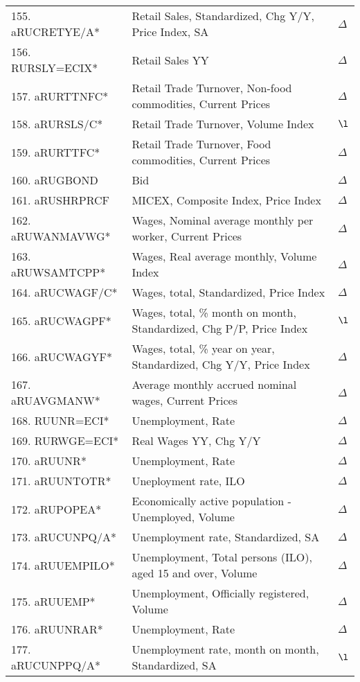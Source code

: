 \documentclass[a4paper, 14pt]{article}
\begin{document}
\begin{center}
\begin{longtable}{p{5.5cm} p{10cm} p{0.15cm}}
	155. aRUCRETYE/A* &  Retail Sales, Standardized, Chg Y/Y, Price Index, SA & $\Delta$\\
	156. RURSLY=ECIX* &  Retail Sales YY & $\Delta$\\
	157. aRURTTNFC* &  Retail Trade Turnover, Non-food commodities, Current Prices & $\Delta$\\
	158. aRURSLS/C* &  Retail Trade Turnover, Volume Index & $\l$\\
	159. aRURTTFC* &  Retail Trade Turnover, Food commodities, Current Prices & $\Delta$\\
	160. aRUGBOND &  Bid & $\Delta$\\
	161. aRUSHRPRCF &  MICEX, Composite Index, Price Index & $\Delta$\\
	162. aRUWANMAVWG* &  Wages, Nominal average monthly per worker, Current Prices & $\Delta$\\
	163. aRUWSAMTCPP* &  Wages, Real average monthly, Volume Index & $\Delta$\\
	164. aRUCWAGF/C* &  Wages, total, Standardized, Price Index & $\Delta$\\
	165. aRUCWAGPF* &  Wages, total, \% month on month, Standardized, Chg P/P, Price Index & $\l$\\
	166. aRUCWAGYF* &  Wages, total, \% year on year, Standardized, Chg Y/Y, Price Index & $\Delta$\\
	167. aRUAVGMANW* &  Average monthly accrued nominal wages, Current Prices & $\Delta$\\
	168. RUUNR=ECI* &  Unemployment, Rate & $\Delta$\\
	169. RURWGE=ECI* &  Real Wages YY, Chg Y/Y & $\Delta$\\
	170. aRUUNR* &  Unemployment, Rate & $\Delta$\\
	171. aRUUNTOTR* &  Uneployment rate, ILO & $\Delta$\\
	172. aRUPOPEA* &  Economically active population - Unemployed, Volume & $\Delta$\\
	173. aRUCUNPQ/A* &  Unemployment rate, Standardized, SA & $\Delta$\\
	174. aRUUEMPILO* &  Unemployment, Total persons (ILO), aged 15 and over, Volume & $\Delta$\\
	175. aRUUEMP* &  Unemployment, Officially registered, Volume & $\Delta$\\
	176. aRUUNRAR* &  Unemployment, Rate & $\Delta$\\
	177. aRUCUNPPQ/A* &  Unemployment rate, month on month, Standardized, SA & $\l$\\

\end{longtable}
\end{center}
\end{document}
